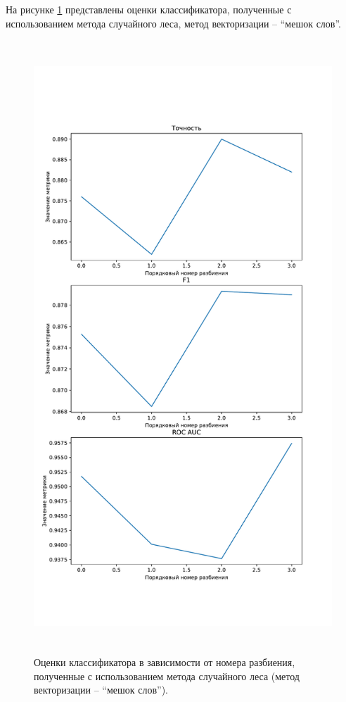 На рисунке \ref{img:randomMetricsBag} представлены оценки классификатора, полученные с использованием метода случайного леса, метод векторизации -- ``мешок слов''.
\begin{figure}[H]
	\centering
	\includegraphics[height=23cm]{inc/plots/randomMetricsBag.pdf}
	\caption{ Оценки классификатора в зависимости от номера разбиения, полученные с использованием метода случайного леса (метод векторизации --  ``мешок слов''). }
	\label{img:randomMetricsBag}
\end{figure}


